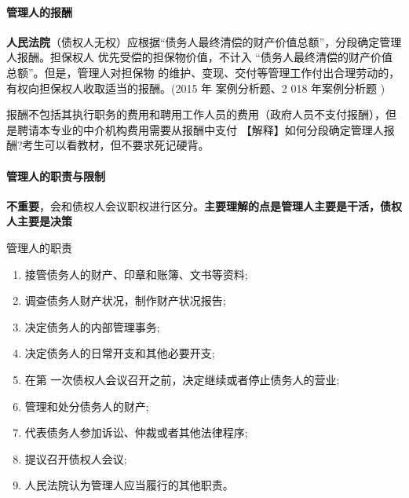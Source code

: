 \documentclass[UTF8,12pt]{ctexart}
\numberwithin{equation}{section} %
\numberwithin{figure}{section}
\numberwithin{table}{section}
\begin{document}
	\paragraph{管理人的报酬}
	
	\textbf{人民法院}（债权人无权）应根据“债务人最终清偿的财产价值总额”，分段确定管理人报酬。担保权人 优先受偿的担保物价值，不计入 “债务人最终清偿的财产价值总额”。但是，管理人对担保物 的维护、变现、交付等管理工作付出合理劳动的，有权向担保权人收取适当的报酬。(2015 年 案例分析题、2 018 年案例分析题 )
	
	报酬不包括其执行职务的费用和聘用工作人员的费用（政府人员不支付报酬），但是聘请本专业的中介机构费用需要从报酬中支付
	【解释】如何分段确定管理人报酬?考生可以看教材，但不要求死记硬背。
	
	\paragraph{管理人的职责与限制}
	\textbf{不重要}，会和债权人会议职权进行区分。\textbf{主要理解的点是管理人主要是干活，债权人主要是决策}
	
	管理人的职责
	\begin{enumerate}
		\item 接管债务人的财产、印章和账簿、文书等资料;
		
		\item 调查债务人财产状况，制作财产状况报告;
		
		\item 决定债务人的内部管理事务;
		
		\item 决定债务人的日常开支和其他必要开支;
		
		\item 在第 一次债权人会议召开之前，决定继续或者停止债务人的营业;
		
		\item 管理和处分债务人的财产;
		
		\item 代表债务人参加诉讼、仲裁或者其他法律程序;
		
		\item 提议召开债权人会议;
		
		\item 人民法院认为管理人应当履行的其他职责。
	\end{enumerate}
	
\end{document}
